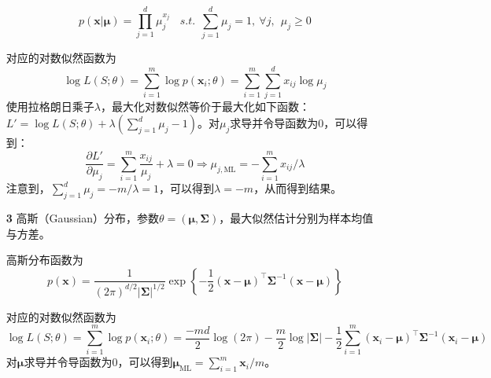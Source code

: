 \documentclass{article}
\begin{document}
\begin{itemize}
\begin{scriptsize}
\begin{spacing}{1.2}
{	\begin{equation*}
	p(\bm{x}|\bm{\mu}) = \prod_{j=1}^d \mu_j^{x_j}\ \ \ \ \mathit{s.t.}\ \ \sum_{j=1}^d \mu_j=1,\ \forall j,\ \ \mu_j\geq 0
	\end{equation*}

	对应的对数似然函数为
	\begin{equation*}
	\log L(S;\theta) = \sum_{i=1}^m \log p(\bm{x}_i;\theta) = \sum_{i=1}^m \sum_{j=1}^d x_{ij} \log \mu_j
	\end{equation*}
使用拉格朗日乘子$\lambda$，最大化对数似然等价于最大化如下函数：$L' = \log L(S;\theta) + \lambda \left( \sum_{j=1}^d \mu_j - 1 \right) $。对$\mu_j$求导并令导函数为0，可以得到：
	\begin{equation*}
	\frac{\partial L'}{\partial \mu_j} = \sum_{i=1}^m\frac{x_{ij}}{\mu_j} + \lambda = 0  \Longrightarrow	 \mu_{j,\mathrm{ML}} = -\sum_{i=1}^m x_{ij}/\lambda
	\end{equation*}
注意到，$\sum_{j=1}^d \mu_j=-m/\lambda=1$，可以得到$\lambda=-m$，从而得到结果。
	}
	\end{spacing}
	\end{scriptsize}
	\vspace{-1mm}
	
	\item [\textbf{3}] 高斯（Gaussian）分布，参数$\theta=(\bm{\mu},\bm{\Sigma})$，最大似然估计分别为样本均值与方差。
	\vspace{1mm}
	\begin{scriptsize}
	\begin{spacing}{1.2}
	{\sffamily
	高斯分布函数为
	\begin{equation*}
	p(\bm{x}) = \frac{1}{(2\pi)^{d/2} |\bm{\Sigma}|^{1/2}} \exp \left\{ -\frac{1}{2} (\bm{x} - \bm{\mu})^\top \bm{\Sigma}^{-1} (\bm{x} - \bm{\mu})\right\}
	\end{equation*}
	
	对应的对数似然函数为
	\begin{equation*}
	\log L(S;\theta) = \sum_{i=1}^m \log p(\bm{x}_i;\theta) 
	= \frac{-md}{2} \log (2\pi) - \frac{m}{2}\log |\bm{\Sigma}| - \frac{1}{2} \sum_{i=1}^m (\bm{x}_i - \bm{\mu})^\top \bm{\Sigma}^{-1} (\bm{x}_i - \bm{\mu})
	\end{equation*}
	对$\bm{\mu}$求导并令导函数为0，可以得到$\bm{\mu}_{\mathrm{ML}}= \sum_{i=1}^m \bm{x}_i/m$。
	
}
\end{spacing}
\end{scriptsize}
\end{itemize}
\end{document}
